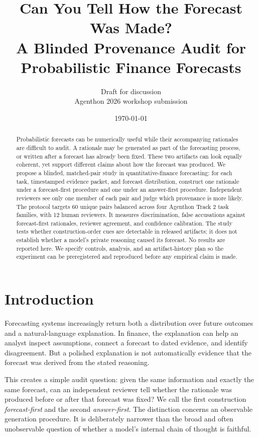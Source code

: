\documentclass[10pt]{article}
\title{Can You Tell How the Forecast Was Made?\\A Blinded Provenance Audit for Probabilistic Finance Forecasts}
\author{Draft for discussion\\[2pt]\small Agenthon 2026 workshop submission}
\date{\today}
\begin{document}
\maketitle

\begin{abstract}
Probabilistic forecasts can be numerically useful while their accompanying rationales are difficult to audit. A rationale may be generated as part of the forecasting process, or written after a forecast has already been fixed. These two artifacts can look equally coherent, yet support different claims about how the forecast was produced. We propose a blinded, matched-pair study in quantitative-finance forecasting: for each task, timestamped evidence packet, and forecast distribution, construct one rationale under a forecast-first procedure and one under an answer-first procedure. Independent reviewers see only one member of each pair and judge which provenance is more likely. The protocol targets 60 unique pairs balanced across four Agenthon Track 2 task families, with 12 human reviewers. It measures discrimination, false accusations against forecast-first rationales, reviewer agreement, and confidence calibration. The study tests whether construction-order cues are detectable in released artifacts; it does not establish whether a model's private reasoning caused its forecast. No results are reported here. We specify controls, analysis, and an artifact-history plan so the experiment can be preregistered and reproduced before any empirical claim is made.
\end{abstract}

\section{Introduction}
Forecasting systems increasingly return both a distribution over future outcomes and a natural-language explanation. In finance, the explanation can help an analyst inspect assumptions, connect a forecast to dated evidence, and identify disagreement. But a polished explanation is not automatically evidence that the forecast was derived from the stated reasoning.

This creates a simple audit question: given the same information and exactly the same forecast, can an independent reviewer tell whether the rationale was produced before or after that forecast was fixed? We call the first construction \emph{forecast-first} and the second \emph{answer-first}. The distinction concerns an observable generation procedure. It is deliberately narrower than the broad and often unobservable question of whether a model's internal chain of thought is faithful.
\end{document}
